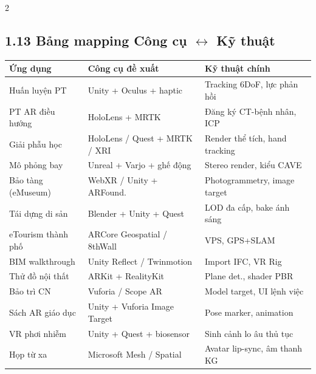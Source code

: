 \begin{paracol}{2}
\subsection*{1.13 Bảng mapping Công cụ $\leftrightarrow$ Kỹ thuật}
{\scriptsize
\begin{tabular}{@{}p{2.1cm}p{2.6cm}p{2.4cm}@{}}
\toprule
\textbf{Ứng dụng} & \textbf{Công cụ đề xuất} & \textbf{Kỹ thuật chính} \\
\midrule
Huấn luyện PT & Unity + Oculus + haptic & Tracking 6DoF, lực phản hồi \\
PT AR điều hướng & HoloLens + MRTK & Đăng ký CT-bệnh nhân, ICP \\
Giải phẫu học & HoloLens / Quest + MRTK / XRI & Render thể tích, hand tracking \\
Mô phỏng bay & Unreal + Varjo + ghế động & Stereo render, kiểu CAVE \\
Bảo tàng (eMuseum) & WebXR / Unity + ARFound. & Photogrammetry, image target \\
Tái dựng di sản & Blender + Unity + Quest & LOD đa cấp, bake ánh sáng \\
eTourism thành phố & ARCore Geospatial / 8thWall & VPS, GPS+SLAM \\
BIM walkthrough & Unity Reflect / Twinmotion & Import IFC, VR Rig \\
Thử đồ nội thất & ARKit + RealityKit & Plane det., shader PBR \\
Bảo trì CN & Vuforia / Scope AR & Model target, UI lệnh việc \\
Sách AR giáo dục & Unity + Vuforia Image Target & Pose marker, animation \\
VR phơi nhiễm & Unity + Quest + biosensor & Sinh cảnh lo âu thủ tục \\
Họp từ xa & Microsoft Mesh / Spatial & Avatar lip-sync, âm thanh KG \\
\bottomrule
\end{tabular}}

\switchcolumn*


\end{paracol}
